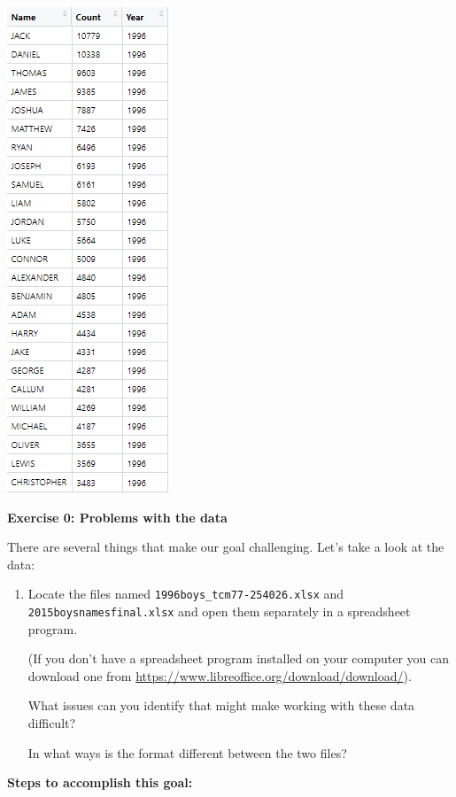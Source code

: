 \documentclass[
]{book}
\begin{document}
\includegraphics{R/RDataWrangling/images/goal.png}

\textbf{Exercise 0: Problems with the data}

There are several things that make our goal challenging. Let's take a look at the data:

\begin{enumerate}
\def\labelenumi{\arabic{enumi}.}
\item
  Locate the files named \texttt{1996boys\_tcm77-254026.xlsx} and
  \texttt{2015boysnamesfinal.xlsx} and open them separately in a
  spreadsheet program.

  (If you don't have a spreadsheet program installed on
  your computer you can download one from
  \url{https://www.libreoffice.org/download/download/}).

  What issues can you identify that might make working
  with these data difficult?

  In what ways is the format different between the two files?
\end{enumerate}

\textbf{Steps to accomplish this goal:}
\end{document}
